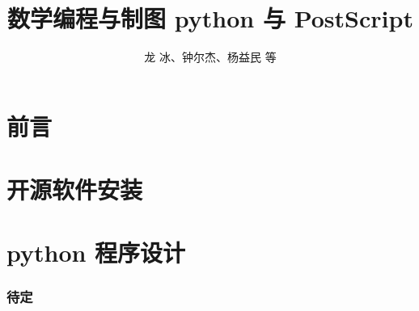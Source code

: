 \documentclass[zihao=-4,linespread=1.5,heading=true,a4paper,twoside]{ctexart}
\title{数学编程与制图 python 与 PostScript}
\author{龙 冰、钟尔杰、杨益民 等}
\begin{document}
\begin{titlepage}
	\maketitle
\end{titlepage}

\part*{前言}\label{sec:preface}


\newpage\tableofcontents

\newpage\part{开源软件安装}


\newpage\part{python 程序设计}
\section{待定}\label{sec:II.1}


%

%

%

%
\end{document}
